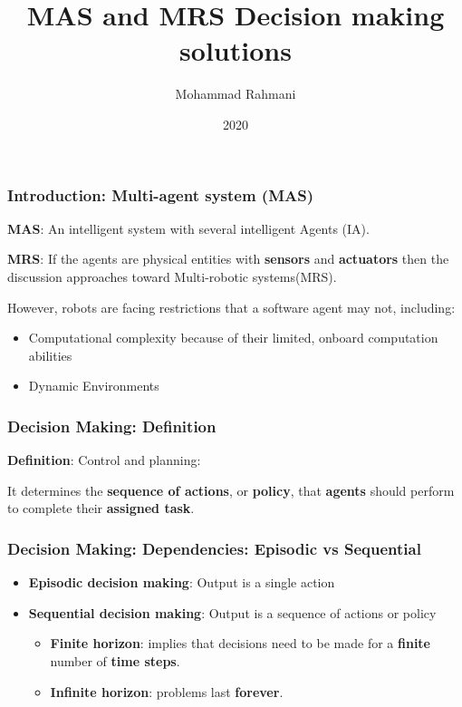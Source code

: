 \documentclass{beamer}
\title{MAS and MRS Decision making solutions}
\author{Mohammad Rahmani}
\institute{Klagenfurt University}
\date{2020}
\begin{document}
\frame{\titlepage}

	\begin{frame}
		\frametitle{Introduction: Multi-agent system (MAS)}
		 \textbf{MAS}: An intelligent system with several intelligent Agents (IA). 
		 
		 \vspace{0.25in}
		 
		 \textbf{MRS}: If the agents are physical entities with \textbf{sensors} and \textbf{actuators} then the discussion approaches toward Multi-robotic systems(MRS). 
		 
		 \vspace{0.1in}
		 
		 However, robots are facing restrictions that a software agent may not, including:
		\begin{itemize}
			\item Computational complexity because of their limited, onboard computation abilities
			\item Dynamic Environments
		\end{itemize} 
	\end{frame}
	
	\begin{frame}
		\frametitle{Decision Making: Definition}
		\textbf{Definition}: Control and planning: 
		
		\vspace{0.1in}
		It determines the \textbf{sequence of actions}, or \textbf{policy}, that \textbf{agents} should perform to complete their \textbf{assigned task}.
		
	\end{frame}

	\begin{frame}
		\frametitle{Decision Making: Dependencies: Episodic vs Sequential}
		\begin{itemize}
			\item \textbf{Episodic decision making}: Output is a single action
			\item \textbf{Sequential decision making}: Output is a sequence of actions or policy
			\begin{itemize}
				\item \textbf{Finite horizon}: implies that decisions need to be made for a \textbf{finite} number of \textbf{time steps}.
				\item \textbf{Infinite horizon}: problems last \textbf{forever}.
			\end{itemize}	
		\end{itemize}
	\end{frame}
\end{document}
